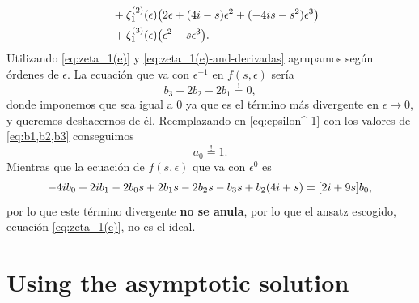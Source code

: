 \documentclass[%
 aip,
 jmp,%
 amsmath,amssymb,
 reprint,%
]{revtex4-2}
\begin{document}
{\begin{equation}
\begin{aligned}
    &\quad +\zeta_1^{(2)}(\epsilon) \qty(2\epsilon + (4i - s)\epsilon^2 + (-4is - s^2)\epsilon^3)\\
    &\quad +\zeta_1^{(3)}(\epsilon) \qty(\epsilon^2 - s\epsilon^3).
\end{aligned}
\end{equation}
Utilizando \eqref{eq:zeta_1(e)} y \eqref{eq:zeta_1(e)-and-derivadas} agrupamos según órdenes de $\epsilon$. La ecuación que va con $\epsilon^{-1}$ en $f(s,\epsilon)$ sería
\begin{equation}\label{eq:epsilon^-1}
    b_3 + 2b_2 - 2b_1 \stackrel{!}{=} 0,
\end{equation}
donde imponemos que sea igual a $0$ ya que es el término más divergente en $\epsilon \to 0$, y queremos deshacernos de él. Reemplazando en \eqref{eq:epsilon^-1} con los valores de \eqref{eq:b1,b2,b3} conseguimos 
\begin{equation}
    a_0 \stackrel{!}{=} 1.
\end{equation}
Mientras que la ecuación de $f(s,\epsilon)$ que va con $\epsilon^0$ es
\begin{equation}
    -4ib_0 + 2ib_1 - 2b_0s + 2b_1s - 2b_2s - b_3s + b_2(4i + s) = \qty[2i + 9s]b_0,
\end{equation}
por lo que este término divergente \textbf{no se anula}, por lo que el ansatz escogido, ecuación \eqref{eq:zeta_1(e)}, no es el ideal.
}

\section{\label{subsec:Ansatz 2}Using the asymptotic solution}
\end{document}
